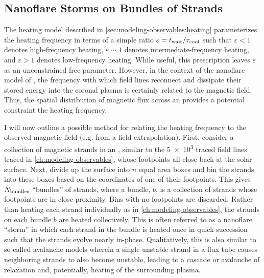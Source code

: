 \subsection{Nanoflare Storms on Bundles of Strands}\label{sec:bundle}

The heating model described in \autoref{sec:modeling-observables:heating} parameterizes the heating frequency in terms of a simple ratio $\varepsilon=t_{\textup{wait}}/\tau_\textup{cool}$ such that $\varepsilon<1$ denotes high-frequency heating, $\varepsilon\sim1$ denotes intermediate-frequency heating, and $\varepsilon>1$ denotes low-frequency heating. While useful, this prescription leaves $\varepsilon$ as an unconstrained free parameter. However, in the context of the nanoflare model of \citet[see \autoref{sec:nanoflares}]{parker_nanoflares_1988}, the frequency with which field lines reconnect and dissipate their stored energy into the coronal plasma is certainly related to the magnetic field. Thus, the spatial distribution of magnetic flux across an \AR{} provides a potential constraint the heating frequency.

I will now outline a possible method for relating the heating frequency to the observed magnetic field (e.g. from a field extrapolation). First, consider a collection of magnetic strands in an \AR{}, similar to the \num{5e3} traced field lines traced in \autoref{ch:modeling-observables}, whose footpoints all close back at the solar surface. Next, divide up the surface into $n$ equal area boxes and bin the strands into these boxes based on the coordinates of one of their footpoints. This gives $N_\textup{bundles}$ ``bundles'' of strands, where a bundle, $b$, is a collection of strands whose footpoints are in close proximity. Bins with no footpoints are discarded. Rather than heating each strand individually as in \autoref{ch:modeling-observables}, the strands on each bundle $b$ are heated collectively. This is often referred to as a nanoflare ``storm'' in which each strand in the bundle is heated once in quick succession \citep{klimchuk_key_2015,schmelz_what_2015,mulu-moore_can_2011} such that the strands evolve nearly in-phase. Qualitatively, this is also similar to so-called avalanche models \citep[e.g.][]{hood_mhd_2016} wherein a single unstable strand in a flux tube causes neighboring strands to also become unstable, leading to a cascade or avalanche of relaxation and, potentially, heating of the surrounding plasma.

